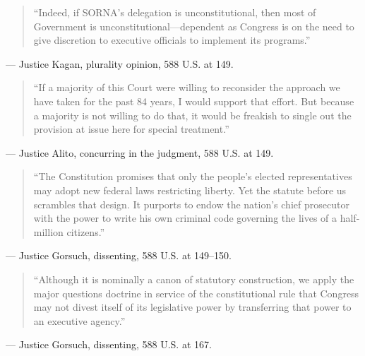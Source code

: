 \documentclass[12pt]{article}
\begin{document}
\begin{quote}
``Indeed, if SORNA's delegation is unconstitutional, then most of Government is unconstitutional---dependent as Congress is on the need to give discretion to executive officials to implement its programs.''
\end{quote}
\noindent --- Justice Kagan, plurality opinion, 588 U.S. at 149.

\begin{quote}
``If a majority of this Court were willing to reconsider the approach we have taken for the past 84 years, I would support that effort. But because a majority is not willing to do that, it would be freakish to single out the provision at issue here for special treatment.''
\end{quote}
\noindent --- Justice Alito, concurring in the judgment, 588 U.S. at 149.

\begin{quote}
``The Constitution promises that only the people's elected representatives may adopt new federal laws restricting liberty. Yet the statute before us scrambles that design. It purports to endow the nation's chief prosecutor with the power to write his own criminal code governing the lives of a half-million citizens.''
\end{quote}
\noindent --- Justice Gorsuch, dissenting, 588 U.S. at 149--150.

\begin{quote}
``Although it is nominally a canon of statutory construction, we apply the major questions doctrine in service of the constitutional rule that Congress may not divest itself of its legislative power by transferring that power to an executive agency.''
\end{quote}
\noindent --- Justice Gorsuch, dissenting, 588 U.S. at 167.
\end{document}
